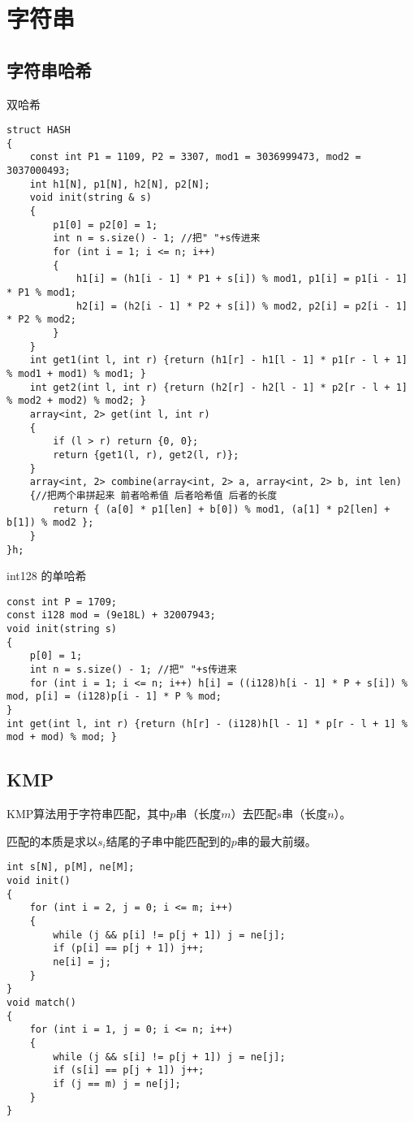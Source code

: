 \documentclass[a4paper,fontset=none]{ctexart}
\begin{document}
\section{字符串}
\subsection{字符串哈希}
双哈希
\begin{verbatim}
struct HASH
{
    const int P1 = 1109, P2 = 3307, mod1 = 3036999473, mod2 = 3037000493;
    int h1[N], p1[N], h2[N], p2[N];
    void init(string & s)
    {
        p1[0] = p2[0] = 1;
        int n = s.size() - 1; //把" "+s传进来
        for (int i = 1; i <= n; i++)
        {
            h1[i] = (h1[i - 1] * P1 + s[i]) % mod1, p1[i] = p1[i - 1] * P1 % mod1;
            h2[i] = (h2[i - 1] * P2 + s[i]) % mod2, p2[i] = p2[i - 1] * P2 % mod2;
        }
    }
    int get1(int l, int r) {return (h1[r] - h1[l - 1] * p1[r - l + 1] % mod1 + mod1) % mod1; }
    int get2(int l, int r) {return (h2[r] - h2[l - 1] * p2[r - l + 1] % mod2 + mod2) % mod2; }
    array<int, 2> get(int l, int r)
    {
        if (l > r) return {0, 0};
        return {get1(l, r), get2(l, r)};
    }
    array<int, 2> combine(array<int, 2> a, array<int, 2> b, int len)
    {//把两个串拼起来 前者哈希值 后者哈希值 后者的长度
        return { (a[0] * p1[len] + b[0]) % mod1, (a[1] * p2[len] + b[1]) % mod2 };
    }
}h;
\end{verbatim}

int128 的单哈希

\begin{verbatim}
const int P = 1709;
const i128 mod = (9e18L) + 32007943;
void init(string s)
{
    p[0] = 1;
    int n = s.size() - 1; //把" "+s传进来
    for (int i = 1; i <= n; i++) h[i] = ((i128)h[i - 1] * P + s[i]) % mod, p[i] = (i128)p[i - 1] * P % mod;
}
int get(int l, int r) {return (h[r] - (i128)h[l - 1] * p[r - l + 1] % mod + mod) % mod; }
\end{verbatim}
\subsection{KMP}

KMP算法用于字符串匹配，其中$p$串（长度$m$）去匹配$s$串（长度$n$）。

匹配的本质是求以$s_i$结尾的子串中能匹配到的$p$串的最大前缀。

\begin{verbatim}
int s[N], p[M], ne[M];
void init()
{
    for (int i = 2, j = 0; i <= m; i++)
    {
        while (j && p[i] != p[j + 1]) j = ne[j];
        if (p[i] == p[j + 1]) j++;
        ne[i] = j;
    }
}
void match()
{
    for (int i = 1, j = 0; i <= n; i++)
    {
        while (j && s[i] != p[j + 1]) j = ne[j];
        if (s[i] == p[j + 1]) j++;
        if (j == m) j = ne[j];
    }
}
\end{verbatim}
\end{document}
